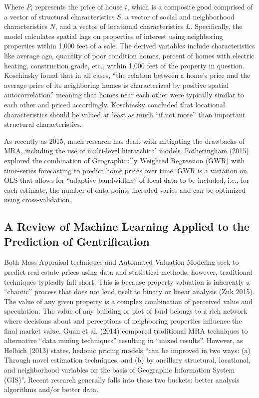 \documentclass[12pt,]{article}
\begin{document}
Where \(P_i\) represents the price of house \(i\), which is a composite
good comprised of a vector of structural characteristics \(S\), a vector
of social and neighborhood characteristics \(N\), and a vector of
locational characteristics \(L\). Specifically, the model calculates
spatial lags on properties of interest using neighboring properties
within 1,000 feet of a sale. The derived variables include
characteristics like average age, quantity of poor condition homes,
percent of homes with electric heating, construction grade, etc., within
1,000 feet of the property in question. Koschinsky found that in all
cases, ``the relation between a home's price and the average price of
its neighboring homes is characterized by positive spatial
autocorrelation'' meaning that homes near each other were typically
similar to each other and priced accordingly. Koschinsky concluded that
locational characteristics should be valued at least as much ``if not
more'' than important structural characteristics.

As recently as 2015, much research has dealt with mitigating the
drawbacks of MRA, including the use of multi-level hierarchical models.
Fotheringham (2015) explored the combination of Geographically Weighted
Regression (GWR) with time-series forecasting to predict home prices
over time. GWR is a variation on OLS that allows for ``adaptive
bandwidths'' of local data to be included, i.e., for each estimate, the
number of data points included varies and can be optimized using
cross-validation.

\hypertarget{a-review-of-machine-learning-applied-to-the-prediction-of-gentrification}{%
\subsection{A Review of Machine Learning Applied to the Prediction of
Gentrification}\label{a-review-of-machine-learning-applied-to-the-prediction-of-gentrification}}

Both Mass Appraisal techniques and Automated Valuation Modeling seek to
predict real estate prices using data and statistical methods, however,
traditional techniques typically fall short. This is because property
valuation is inherently a ``chaotic'' process that does not lend itself
to binary or linear analysis (Zuk 2015). The value of any given property
is a complex combination of perceived value and speculation. The value
of any building or plot of land belongs to a rich network where
decisions about and perceptions of neighboring properties influence the
final market value. Guan et al. (2014) compared traditional MRA
techniques to alternative ``data mining techniques'' resulting in
``mixed results''. However, as Helbich (2013) states, hedonic pricing
models ``can be improved in two ways: (a) Through novel estimation
techniques, and (b) by ancillary structural, locational, and
neighborhood variables on the basis of Geographic Information System
(GIS)''. Recent research generally falls into these two buckets: better
analysis algorithms and/or better data.
\end{document}
